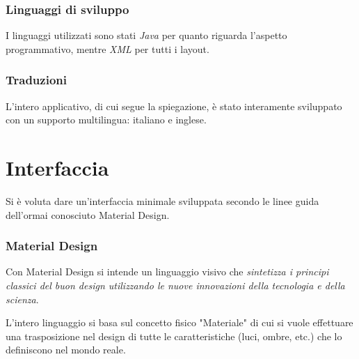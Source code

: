 \subsubsection{Linguaggi di sviluppo}
I linguaggi utilizzati sono stati \textit{Java} per quanto riguarda l'aspetto programmativo, mentre \textit{XML} per tutti i layout.
\subsubsection{Traduzioni}
L'intero applicativo, di cui segue la spiegazione, è stato interamente sviluppato con un supporto multilingua: italiano e inglese.

\section{Interfaccia}
Si è voluta dare un'interfaccia minimale sviluppata secondo le linee guida dell'ormai conosciuto Material Design.

\subsubsection{Material Design}
Con Material Design \cite{material} si intende un linguaggio visivo che \textit{sintetizza i principi classici 
del buon design utilizzando le nuove innovazioni della tecnologia e della scienza}.

L'intero linguaggio si basa sul concetto fisico "Materiale" di cui si vuole effettuare una trasposizione nel 
design di tutte le caratteristiche (luci, ombre, etc.) che lo definiscono nel mondo reale.

